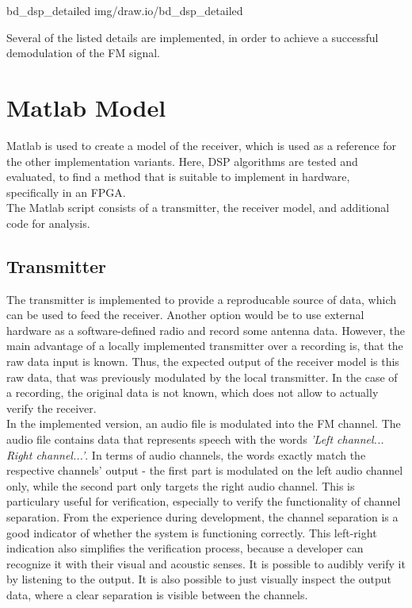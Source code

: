 {bd_dsp_detailed} {img/draw.io/bd_dsp_detailed}

\noindent
Several of the listed details are implemented, in order to achieve a successful demodulation of the FM signal.

\section{Matlab Model}

Matlab is used to create a model of the receiver, which is used as a reference for the other implementation variants.
Here, DSP algorithms are tested and evaluated, to find a method that is suitable to implement in hardware, specifically in an FPGA.\\

The Matlab script consists of a transmitter, the receiver model, and additional code for analysis.

\subsection{Transmitter}

The transmitter is implemented to provide a reproducable source of data, which can be used to feed the receiver.
Another option would be to use external hardware as a software-defined radio and record some antenna data.
However, the main advantage of a locally implemented transmitter over a recording is, that the raw data input is known.
Thus, the expected output of the receiver model is this raw data, that was previously modulated by the local transmitter.
In the case of a recording, the original data is not known, which does not allow to actually verify the receiver.\\

In the implemented version, an audio file is modulated into the FM channel.
The audio file contains data that represents speech with the words \textit{'Left channel... Right channel...'}.
In terms of audio channels, the words exactly match the respective channels' output - the first part is modulated on the left audio channel only, while the second part only targets the right audio channel.
This is particulary useful for verification, especially to verify the functionality of channel separation.
From the experience during development, the channel separation is a good indicator of whether the system is functioning correctly.
This left-right indication also simplifies the verification process, because a developer can recognize it with their visual and acoustic senses.
It is possible to audibly verify it by listening to the output.
It is also possible to just visually inspect the output data, where a clear separation is visible between the channels.\\

